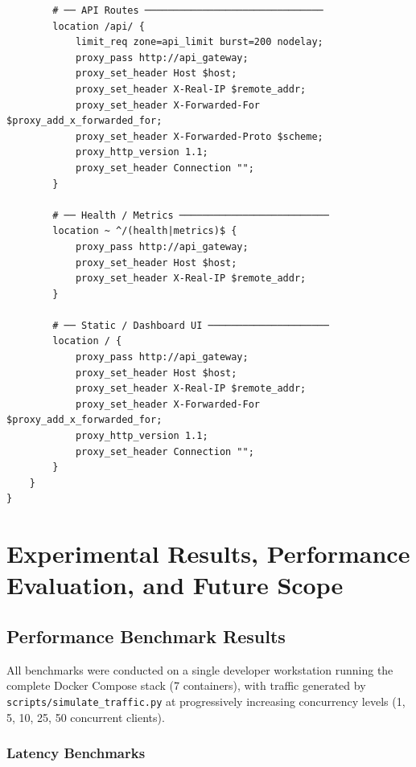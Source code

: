 \documentclass[12pt,a4paper]{report}
\begin{document}
\begin{lstlisting}
        # ── API Routes ───────────────────────────────
        location /api/ {
            limit_req zone=api_limit burst=200 nodelay;
            proxy_pass http://api_gateway;
            proxy_set_header Host $host;
            proxy_set_header X-Real-IP $remote_addr;
            proxy_set_header X-Forwarded-For $proxy_add_x_forwarded_for;
            proxy_set_header X-Forwarded-Proto $scheme;
            proxy_http_version 1.1;
            proxy_set_header Connection "";
        }

        # ── Health / Metrics ──────────────────────────
        location ~ ^/(health|metrics)$ {
            proxy_pass http://api_gateway;
            proxy_set_header Host $host;
            proxy_set_header X-Real-IP $remote_addr;
        }

        # ── Static / Dashboard UI ─────────────────────
        location / {
            proxy_pass http://api_gateway;
            proxy_set_header Host $host;
            proxy_set_header X-Real-IP $remote_addr;
            proxy_set_header X-Forwarded-For $proxy_add_x_forwarded_for;
            proxy_http_version 1.1;
            proxy_set_header Connection "";
        }
    }
}
\end{lstlisting}
\newpage


\chapter{Experimental Results, Performance Evaluation, and Future Scope}

\section{Performance Benchmark Results}

All benchmarks were conducted on a single developer workstation running the
complete Docker Compose stack (7 containers), with traffic generated by
\texttt{scripts/simulate\_traffic.py} at progressively increasing concurrency
levels (1, 5, 10, 25, 50 concurrent clients).

\subsection{Latency Benchmarks}
\end{document}
